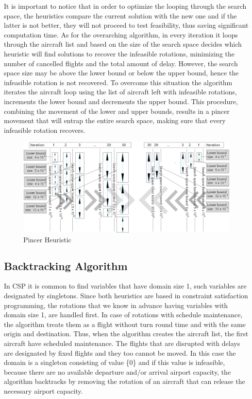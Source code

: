 It is important to notice that in order to optimize the looping through the search space, the heuristics compare the current solution with the new one and if the latter is not better, they will not proceed to test feasibility, thus saving significant computation time. 
As for the overarching algorithm, in every iteration it loops through the aircraft list and based on the size of the search space decides which heuristic will find solutions to recover the infeasible rotations, minimizing the number of cancelled flights and the total amount of delay. However, the search space size may be above the lower bound or below the upper bound, hence the infeasible rotation is not recovered. To overcome this situation the algorithm iterates the aircraft loop using the list of aircraft left with infeasible rotations, increments the lower bound %
and decrements the upper bound.%
  This procedure, combining the movement of the lower and upper bounds, results in a pincer movement that will entrap the entire search space, making sure that every infeasible rotation recovers.\\
 
 \begin{figure}[h!]
 	\centering
 	\includegraphics[scale=0.45]{figures/pincer.png}
 	\caption[]{Pincer Heuristic}
 	\label{fig:pincer}
 \end{figure}
%
%
\subsection{Backtracking Algorithm} \label{sec:backtracking}

In CSP it is common to find variables that have domain size 1, such variables are designated by singletons. Since both heuristics are based in constraint satisfaction programming, the rotations that we know in advance having variables with domain size 1, are handled first. In case of rotations with schedule maintenance, the algorithm treats them as a flight without turn round time and with the same origin and destination.  Thus, when the algorithm creates the aircraft list, the first aircraft have scheduled maintenance. The flights that are disrupted with delays are designated by fixed flights and they too cannot be moved. In this case the domain is a singleton consisting of value \{0\} and if this value is infeasible, because there are no available departure and/or arrival airport capacity, the algorithm backtracks by removing the rotation of an aircraft that can release the necessary airport capacity.

